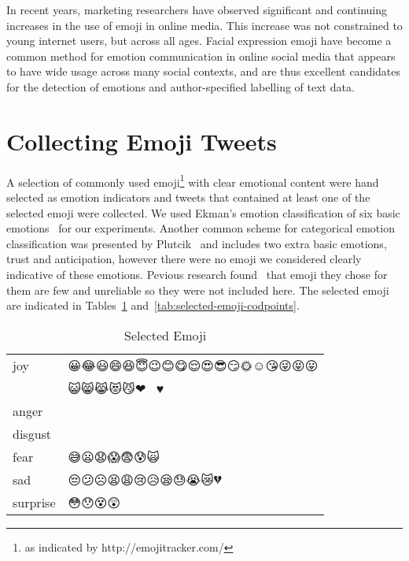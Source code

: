 \documentclass[10pt, a4paper]{article}
\begin{document}
In recent years, marketing researchers have observed significant and continuing increases in the use of emoji in online media. This increase was not constrained to young internet users, but across all ages. 
Facial expression emoji have become a common method for emotion communication in online social media that appears to have wide usage across many social contexts, and are thus excellent candidates for the detection of emotions and author-specified labelling of text data.


\section{Collecting Emoji Tweets}
A selection of commonly used emoji\footnote{as indicated by http://emojitracker.com/} with clear emotional content were hand selected as emotion indicators and tweets that contained at least one of the selected emoji were collected. We used Ekman's emotion classification of six basic emotions~\cite{Ekman1992Argument} for our experiments.
Another common scheme for categorical emotion classification was presented by Plutcik~ and includes two extra basic emotions, trust and anticipation, however
there were no emoji we considered clearly indicative of these emotions. Pevious research found~\cite{Suttles2013Distant} that emoji they chose for them are few and unreliable so they were not included here.
The selected emoji are indicated in Tables~\ref{tab:selected-emoji} and~\ref{tab:selected-emoji-codpoints}.

\begin{table}
	\begin{tabular}{ll}
		joy & 😀😂😃😄😆😇😉😊😋😌😍😎😏🌞☺😘😜😝😛 \\
		& 😺😸😹😻😼❤💖💕😁♥ \\
		anger & 😬😠😐😑😠😡😖😤😾 \\
		disgust & 💩 \\
		fear & 😅😦😧😱😨😰🙀 \\
		sad & 😔😕☹😫😩😢😥😪😓😭😿💔 \\
		surprise & 😳😯😵😲 \\
	\end{tabular}
	\caption{Selected Emoji}
	\label{tab:selected-emoji}
\end{table}
\end{document}
